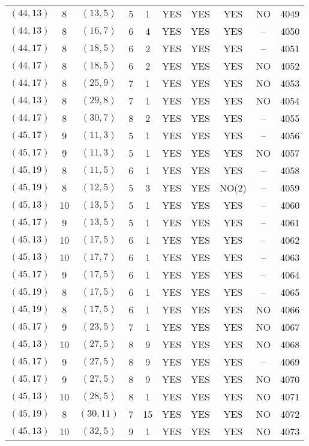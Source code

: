 \begin{longtable}{|c|c|c|c|c|c|c|c|c|c|}
$(44, 13)$ & 8 & $(13, 5)$ & 5 & 1 & YES & YES & YES & NO & 4049\\
$(44, 13)$ & 8 & $(16, 7)$ & 6 & 4 & YES & YES & YES & -- & 4050\\
$(44, 17)$ & 8 & $(18, 5)$ & 6 & 2 & YES & YES & YES & -- & 4051\\
$(44, 17)$ & 8 & $(18, 5)$ & 6 & 2 & YES & YES & YES & NO & 4052\\
$(44, 17)$ & 8 & $(25, 9)$ & 7 & 1 & YES & YES & YES & NO & 4053\\
$(44, 13)$ & 8 & $(29, 8)$ & 7 & 1 & YES & YES & YES & NO & 4054\\
$(44, 17)$ & 8 & $(30, 7)$ & 8 & 2 & YES & YES & YES & -- & 4055\\
$(45, 17)$ & 9 & $(11, 3)$ & 5 & 1 & YES & YES & YES & -- & 4056\\
$(45, 17)$ & 9 & $(11, 3)$ & 5 & 1 & YES & YES & YES & NO & 4057\\
$(45, 19)$ & 8 & $(11, 5)$ & 6 & 1 & YES & YES & YES & -- & 4058\\
$(45, 19)$ & 8 & $(12, 5)$ & 5 & 3 & YES & YES & NO(2) & -- & 4059\\
$(45, 13)$ & 10 & $(13, 5)$ & 5 & 1 & YES & YES & YES & -- & 4060\\
$(45, 17)$ & 9 & $(13, 5)$ & 5 & 1 & YES & YES & YES & -- & 4061\\
$(45, 13)$ & 10 & $(17, 5)$ & 6 & 1 & YES & YES & YES & -- & 4062\\
$(45, 13)$ & 10 & $(17, 7)$ & 6 & 1 & YES & YES & YES & -- & 4063\\
$(45, 17)$ & 9 & $(17, 5)$ & 6 & 1 & YES & YES & YES & -- & 4064\\
$(45, 19)$ & 8 & $(17, 5)$ & 6 & 1 & YES & YES & YES & -- & 4065\\
$(45, 19)$ & 8 & $(17, 5)$ & 6 & 1 & YES & YES & YES & NO & 4066\\
$(45, 17)$ & 9 & $(23, 5)$ & 7 & 1 & YES & YES & YES & NO & 4067\\
$(45, 13)$ & 10 & $(27, 5)$ & 8 & 9 & YES & YES & YES & NO & 4068\\
$(45, 17)$ & 9 & $(27, 5)$ & 8 & 9 & YES & YES & YES & -- & 4069\\
$(45, 17)$ & 9 & $(27, 5)$ & 8 & 9 & YES & YES & YES & NO & 4070\\
$(45, 13)$ & 10 & $(28, 5)$ & 8 & 1 & YES & YES & YES & NO & 4071\\
$(45, 19)$ & 8 & $(30, 11)$ & 7 & 15 & YES & YES & YES & NO & 4072\\
$(45, 13)$ & 10 & $(32, 5)$ & 9 & 1 & YES & YES & YES & NO & 4073\\

\end{longtable}
